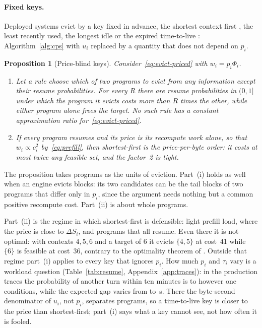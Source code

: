 \documentclass{article}
\newcommand{\leanref}[1]{}
\newcommand{\provedby}[1]{}
\theoremstyle{plain}
\newtheorem{proposition}{Proposition}
\theoremstyle{definition}
\theoremstyle{remark}
\begin{document}
\paragraph{Fixed keys.} Deployed systems evict by a key fixed in
advance, the shortest context first \citep{thunderagent}, the least
recently used, the longest idle or the expired time-to-live
\citep{li2025continuum,xia2026mori}: Algorithm~\ref{alg:cps} with
$u_i$ replaced by a quantity that does not depend on $p_i$.

\begin{proposition}[Price-blind keys]\label{prop:blind}
Consider~\eqref{eq:evict-priced} with $w_i=p_i\Phi_i$.
\begin{enumerate}[nosep,leftmargin=1.6em,label=(\roman*)]
\item Let a rule choose which of two programs to evict from any
  information except their resume probabilities. For every $R$ there
  are resume probabilities in $(0,1]$ under which the program it evicts
  costs more than $R$ times the other, while either program alone frees
  the target. No such rule has a constant approximation ratio
  for~\eqref{eq:evict-priced}.
\item If every program resumes and its price is its recompute work
  alone, so that $w_i\propto c_i^2$ by~\eqref{eq:prefill}, then shortest-first
  is the price-per-byte order: it costs at most twice any feasible set,
  and the factor~2 is tight.
\end{enumerate}
\provedby{\leanref{price\_blind\_rule\_unbounded}, \leanref{shortestFirst\_feasible}, \leanref{shortestFirst\_two\_approx}, \leanref{shortestFirst\_two\_approx\_tight}}
\end{proposition}

The proposition takes programs as the units of eviction. Part~(i) holds
as well when an engine evicts blocks: its two candidates can be the tail
blocks of two programs that differ only in $p_i$, since the argument
needs nothing but a common positive recompute
cost.\provedby{\leanref{price\_blind\_rule\_unbounded\_cost}} Part~(ii)
is about whole programs.

Part~(ii) is the regime in which shortest-first is defensible: light
prefill load, where the price is close to $\Delta S_i$, and programs
that all resume. Even there it is not optimal: with contexts $4,5,6$
and a target of $6$ it evicts $\{4,5\}$ at cost~41 while $\{6\}$ is
feasible at cost~36,\provedby{\leanref{shortestFirst\_not\_optimal}, \leanref{shortestFirst\_optimality\_claim\_false}}
contrary to the optimality theorem of
\citet[Def.~4.1, App.~F.3]{thunderagent}. Outside that regime part~(i)
applies to every key that ignores $p_i$. How much $p_i$ and $\tau_i$
vary is a workload question (Table~\ref{tab:resume},
Appendix~\ref{app:traces}): in the production traces the probability
of another turn within ten minutes is \wkPmin{} to \wkPmax{} however
one conditions, while the expected gap varies from \wkTauMin{} to
\wkTauMax{}\,s. There the byte-second denominator of $u_i$, not $p_i$,
separates programs, so a time-to-live key is closer to the price than
shortest-first; part~(i) says what a key cannot see, not how often it
is fooled.
\end{document}
